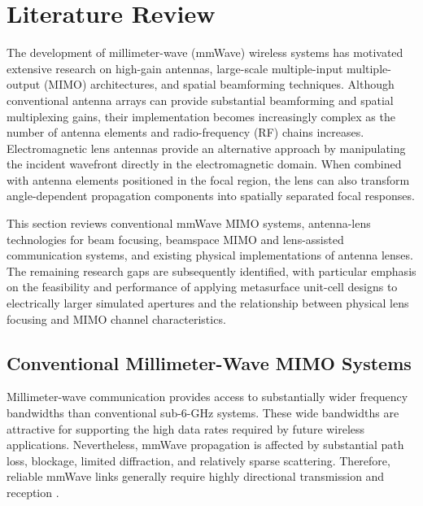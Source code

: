 


\section{Literature Review}
\label{sec:literature_review}

The development of millimeter-wave (mmWave) wireless systems has
motivated extensive research on high-gain antennas, large-scale
multiple-input multiple-output (MIMO) architectures, and spatial
beamforming techniques. Although conventional antenna arrays can
provide substantial beamforming and spatial multiplexing gains, their
implementation becomes increasingly complex as the number of antenna
elements and radio-frequency (RF) chains increases. Electromagnetic
lens antennas provide an alternative approach by manipulating the
incident wavefront directly in the electromagnetic domain. When
combined with antenna elements positioned in the focal region, the
lens can also transform angle-dependent propagation components into
spatially separated focal responses.

This section reviews conventional mmWave MIMO systems, antenna-lens
technologies for beam focusing, beamspace MIMO and lens-assisted
communication systems, and existing physical implementations of antenna
lenses. The remaining research gaps are subsequently identified, with
particular emphasis on the feasibility and performance of applying
metasurface unit-cell designs to electrically larger simulated
apertures and the relationship
between physical lens focusing and MIMO channel characteristics.


\subsection{Conventional Millimeter-Wave MIMO Systems}
\label{subsec:conventional_mmwave_mimo}

Millimeter-wave communication provides access to substantially wider
frequency bandwidths than conventional sub-6-GHz systems. These wide
bandwidths are attractive for supporting the high data rates required
by future wireless applications. Nevertheless, mmWave propagation is
affected by substantial path loss, blockage, limited diffraction, and
relatively sparse scattering. Therefore, reliable mmWave links
generally require highly directional transmission and reception
\cite{Guo2026,Payami2020}.

